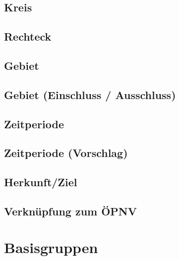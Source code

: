 \subsection*{Kreis}



\subsection*{Rechteck}



\subsection*{Gebiet}



\subsection*{Gebiet (Einschluss / Ausschluss)}



\subsection*{Zeitperiode}



\subsection*{Zeitperiode (Vorschlag)}



\subsection*{Herkunft/Ziel}



\subsection*{Verknüpfung zum ÖPNV}



\section{Basisgruppen}
\label{sec:Datenmodell:Baisgruppen}

